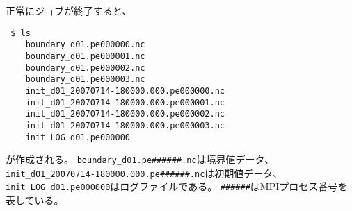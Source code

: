 正常にジョブが終了すると、
\begin{verbatim}
 $ ls
    boundary_d01.pe000000.nc
    boundary_d01.pe000001.nc
    boundary_d01.pe000002.nc
    boundary_d01.pe000003.nc
    init_d01_20070714-180000.000.pe000000.nc
    init_d01_20070714-180000.000.pe000001.nc
    init_d01_20070714-180000.000.pe000002.nc
    init_d01_20070714-180000.000.pe000003.nc
    init_LOG_d01.pe000000
\end{verbatim}
が作成される。
\verb|boundary_d01.pe######.nc|は境界値データ、
\verb|init_d01_20070714-180000.000.pe######.nc|は初期値データ、
\verb|init_LOG_d01.pe000000|はログファイルである。
\verb|######|はMPIプロセス番号を表している。






